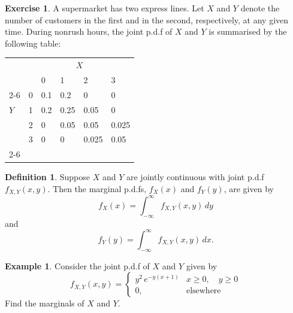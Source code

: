 \documentclass[12pt,a4paper]{report}
\theoremstyle{definition}
\newtheorem{definition}[thm]{Definition}
\newtheorem{example}[thm]{Example}
\newtheorem{exe}[thm]{Exercise}
\theoremstyle{plain}
\theoremstyle{definition}
\begin{document}
\begin{exe}
A supermarket has two express lines. Let $X$ and $Y$ denote the number of customers in the first and in the second, respectively, at any given time. During nonrush hours, the joint p.d.f of $X$ and $Y$ is summarised by the following table:
\begin{table}[H]
\centering
\begin{tabular}{ll|llll|}
 & \multicolumn{5}{c}{$X$}\\
 &    &   0 & 1   &  2 & 3 \\
\cline{2-6}
 &  0 & 0.1 & 0.2 & 0 & 0 \\
$Y$ &  1 & 0.2 & 0.25 & 0.05 & 0 \\
 &  2 &  0 & 0.05 & 0.05 & 0.025 \\
 &  3 &  0 & 0 & 0.025 & 0.05 \\
\cline{2-6}
\end{tabular}
\end{table}
\end{exe}






\begin{definition}
Suppose $X$ and $Y$ are jointly continuous with joint p.d.f $f_{X,Y}(x,y)$. Then the marginal p.d.fs, $f_X(x)$ and $f_Y(y)$, are given by \[f_X(x)  = \int_{-\infty}^{\infty} f_{X,Y}(x,y)\, dy\] and \[f_Y(y) = \int^{\infty}_{-\infty} f_{X,Y}(x,y)\, dx.\]
\end{definition}





\begin{example}
Consider the joint p.d.f of $X$ and $Y$ given by \[f_{X,Y}(x,y) = \begin{cases}
y^2\, e^{-y(x+1)}& x\geq 0, \quad y \geq 0\\
0, & \text{elsewhere}
\end{cases}\]
Find the marginals of $X$ and $Y$.
\end{example}
\end{document}
